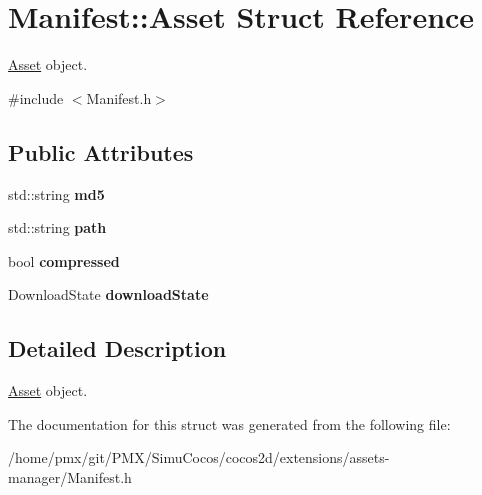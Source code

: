 \hypertarget{structManifest_1_1Asset}{}\section{Manifest\+:\+:Asset Struct Reference}
\label{structManifest_1_1Asset}


\hyperlink{structManifest_1_1Asset}{Asset} object.  




{\ttfamily \#include $<$Manifest.\+h$>$}

\subsection*{Public Attributes}
\begin{DoxyCompactItemize}
\item 
\mbox{\label{structManifest_1_1Asset_aa2b394eba3b441c967e7279e1a80c055}} 
std\+::string {\bfseries md5}
\item 
\mbox{\label{structManifest_1_1Asset_a8f7a0659be9249ba04fbf3acb2c50487}} 
std\+::string {\bfseries path}
\item 
\mbox{\label{structManifest_1_1Asset_a0bc85917c9b512372546f66d470ecb60}} 
bool {\bfseries compressed}
\item 
\mbox{\label{structManifest_1_1Asset_ac96662d4d8f1e49f806d593ad8625ee8}} 
Download\+State {\bfseries download\+State}
\end{DoxyCompactItemize}


\subsection{Detailed Description}
\hyperlink{structManifest_1_1Asset}{Asset} object. 

The documentation for this struct was generated from the following file\+:\begin{DoxyCompactItemize}
\item 
/home/pmx/git/\+P\+M\+X/\+Simu\+Cocos/cocos2d/extensions/assets-\/manager/Manifest.\+h\end{DoxyCompactItemize}
